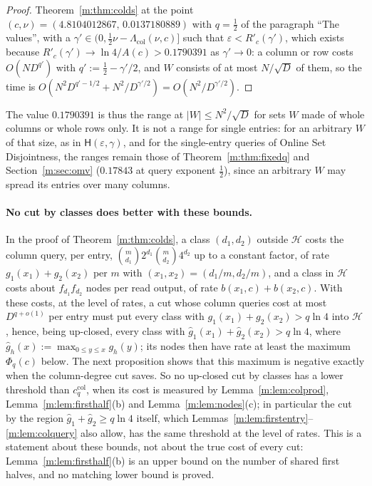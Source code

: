 \documentclass[11pt]{article}
\theoremstyle{definition}
\theoremstyle{remark}
\newcommand{\Hyp}{\mathsf{H}}
\newcommand{\HypHalfRfourteen}{0.17843}%
\newcommand{\ColRangeHalf}{0.1790391}%
\begin{document}
\begin{proof}
Theorem~\ref{m:thm:colds} at the point $(c,\nu)=(4.8104012867,\,0.0137180889)$ with $q=\frac12$ of the paragraph ``The values'', with a $\gamma'\in(0,\frac12\nu-\Lambda_{\mathrm{col}}(\nu,c)]$ such that $\varepsilon<R'_c(\gamma')$, which exists because $R'_c(\gamma')\to\ln4/A(c)>\ColRangeHalf$ as $\gamma'\to0$: a column or row costs $O(ND^{q'})$ with $q':=\frac12-\gamma'/2$, and $W$ consists of at most $N/\sqrt D$ of them, so the time is $O(N^2D^{q'-1/2}+N^2/D^{\gamma'/2})=O(N^2/D^{\gamma'/2})$.
\end{proof}

The value $\ColRangeHalf$ is thus the range at $|W|\le N^2/\sqrt D$ for sets $W$ made of whole columns or whole rows only. It is not a range for single entries: for an arbitrary $W$ of that size, as in $\Hyp(\varepsilon,\gamma)$, and for the single-entry queries of Online Set Disjointness, the ranges remain those of Theorem~\ref{m:thm:fixedq} and Section~\ref{m:sec:omv} ($\HypHalfRfourteen$ at query exponent $\frac12$), since an arbitrary $W$ may spread its entries over many columns.

\paragraph{No cut by classes does better with these bounds.} In the proof of Theorem~\ref{m:thm:colds}, a class $(d_1,d_2)$ outside $\mathcal H$ costs the column query, per entry, $\binom m{d_1}2^{d_1}\binom m{d_2}4^{d_2}$ up to a constant factor, of rate $g_1(x_1)+g_2(x_2)$ per $m$ with $(x_1,x_2)=(d_1/m,d_2/m)$, and a class in $\mathcal H$ costs about $f_{d_1}f_{d_2}$ nodes per read output, of rate $b(x_1,c)+b(x_2,c)$. With these costs, at the level of rates, a cut whose column queries cost at most $D^{q+o(1)}$ per entry must put every class with $g_1(x_1)+g_2(x_2)>q\ln4$ into $\mathcal H$, hence, being up-closed, every class with $\hat g_1(x_1)+\hat g_2(x_2)>q\ln4$, where $\hat g_h(x):=\max_{0\le y\le x}g_h(y)$; its nodes then have rate at least the maximum $\Phi_q(c)$ below. The next proposition shows that this maximum is negative exactly when the column-degree cut saves. So no up-closed cut by classes has a lower threshold than $c^{\mathrm{col}}_q$, when its cost is measured by Lemma~\ref{m:lem:colprod}, Lemma~\ref{m:lem:firsthalf}(b) and Lemma~\ref{m:lem:nodes}(c); in particular the cut by the region $\hat g_1+\hat g_2\ge q\ln4$ itself, which Lemmas~\ref{m:lem:firstentry}--\ref{m:lem:colquery} also allow, has the same threshold at the level of rates. This is a statement about these bounds, not about the true cost of every cut: Lemma~\ref{m:lem:firsthalf}(b) is an upper bound on the number of shared first halves, and no matching lower bound is proved.
\end{document}
